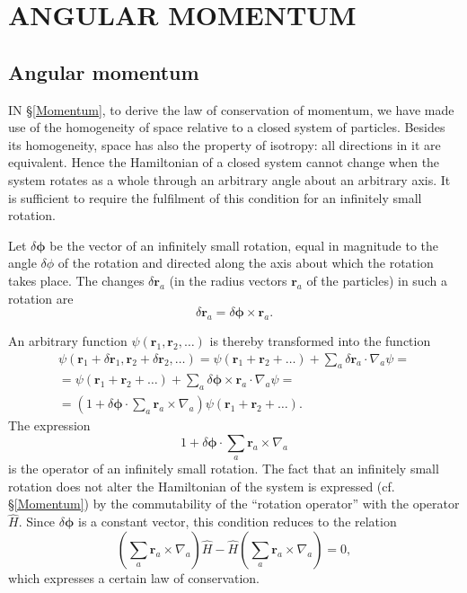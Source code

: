 \chapter{ANGULAR MOMENTUM}
\section{Angular momentum}\label{Angular momentum}
IN \S\ref{Momentum}, to derive the law of conservation of momentum, we have made use of the homogeneity of space relative to a closed system of particles. Besides its homogeneity, space has also the property of isotropy: all directions in it are equivalent. Hence the Hamiltonian of a closed system cannot change when the system rotates as a whole through an arbitrary angle about an arbitrary axis. It is sufficient to require the fulfilment of this condition for an infinitely small rotation.


Let $\delta\bm{\phi}$ be the vector of an infinitely small rotation, equal in magnitude to the angle $\delta\phi$ of the rotation and directed along the axis about which the rotation takes place. The changes $\delta\bm{r}_a$ (in the radius vectors $ \bm{r}_a $ of the particles) in such a rotation are
\[ \delta\bm{r}_a=\delta\bm{\phi}\times\bm{r}_a. \]



An arbitrary function $ \psi(\bm{r}_1,\bm{r}_2,\dots) $ is thereby transformed into the function
\begin{multline*}
\psi(\bm{r}_1+\delta\bm{r}_1,\bm{r}_2+\delta\bm{r}_2,\dots)=\psi(\bm{r}_1+\bm{r}_2+\dots)+\sum_{a}\delta\bm{r}_a\cdot\nabla_a\psi=\\
=\psi(\bm{r}_1+\bm{r}_2+\dots)+\sum_{a}\delta\bm{\phi}\times\bm{r}_a\cdot\nabla_a\psi=\\
=\left(1+\delta\bm{\phi}\cdot\sum_{a}\bm{r}_a\times\nabla_a \right)\psi(\bm{r}_1+\bm{r}_2+\dots).
\end{multline*}
The expression
\[ 1+\delta\bm{\phi}\cdot\sum_{a}\bm{r}_a\times\nabla_a \]
is the operator of an infinitely small rotation. The fact that an infinitely small rotation does not alter the Hamiltonian of the system is expressed (cf. \S\ref{Momentum}) by the commutability of the “rotation operator” with the operator $ \hat{H} $. Since $\delta\bm{\phi}$ is a constant vector, this condition reduces to the relation
\begin{equation}\label{26.1}
\left(\sum_{a}\bm{r}_a\times\nabla_a\right)\hat{H}-\hat{H}\left(\sum_{a}\bm{r}_a\times\nabla_a\right)=0,
\end{equation}
which expresses a certain law of conservation.

